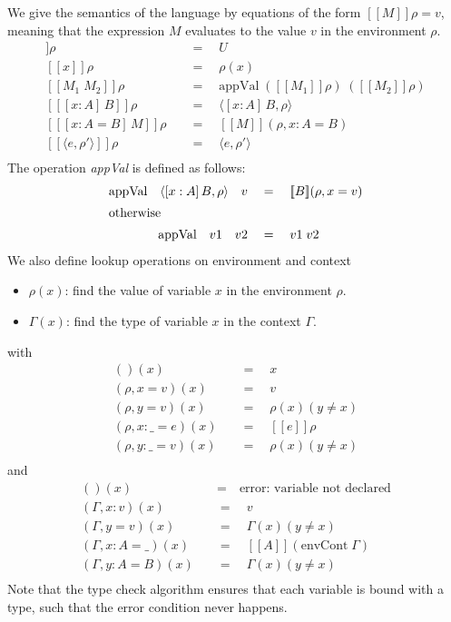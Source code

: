 \documentclass{article}
\theoremstyle{remark}
\begin{document}
We give the semantics of the language by equations of the form $[\![M]\!]\rho = v$, meaning that the expression $M$ evaluates to the value $v$ in the environment $\rho$.
\begin{align*}
  [\![U]\!]\rho \quad &= \quad U \\
  [\![x]\!]\rho \quad &= \quad \rho(x) \\
  [\![M_1 \; M_2]\!]\rho \quad &= \quad \text{appVal} \; ([\![M_1]\!]\rho) \; ([\![M_2]\!]\rho) \\
  [\![[x : A]\,B]\!]\rho \quad &= \quad \langle[x : A]\,B, \rho\rangle \\
  [\![[x : A = B]\,M]\!]\rho \quad &= \quad [\![M]\!](\rho, x : A = B) \\
  [\![\langle e, \rho'\rangle]\!]\rho \quad &= \quad \langle e, \rho' \rangle \\
\end{align*}
The operation \textit{appVal} is defined as follows:
\begin{align*}
  \text{appVal} \quad \langle [x : A]\,B, \rho \rangle \quad v \quad &= \quad [\![B]\!](\rho, x = v) \\
  \intertext{otherwise}
  \text{appVal} \quad v1 \quad v2 \quad &= \quad v1\;v2
\end{align*}
We also define lookup operations on environment and context
\begin{itemize}
\item $\rho(x)$: find the value of variable $x$ in the environment $\rho$.
\item $\Gamma(x)$: find the type of variable $x$ in the context $\Gamma$.
\end{itemize}
with
\begin{align*}
  ()(x) \quad &= \quad x \\
  (\rho, x = v)(x) \quad &= \quad v \\
  (\rho, y = v)(x) \quad &= \quad \rho(x)(y \neq x) \\
  (\rho, x : \_ = e)(x) \quad &= \quad [\![e]\!]\rho \\
  (\rho, y : \_ = v)(x) \quad &= \quad \rho(x)(y \neq x) \\
\end{align*}
and
\begin{align*}
  ()(x) \quad &= \quad \text{error: variable not declared} \\
  (\Gamma, x : v)(x) \quad &= \quad v \\
  (\Gamma, y = v)(x) \quad &= \quad \Gamma(x)(y \neq x) \\
  (\Gamma, x : A = \_)(x) \quad &= \quad [\![A]\!](\text{envCont}\;\Gamma) \\
  (\Gamma, y : A = B)(x) \quad &= \quad \Gamma(x)(y \neq x) \\
\end{align*}
Note that the type check algorithm ensures that each variable is bound with a type, such that the error condition never happens.
\end{document}
